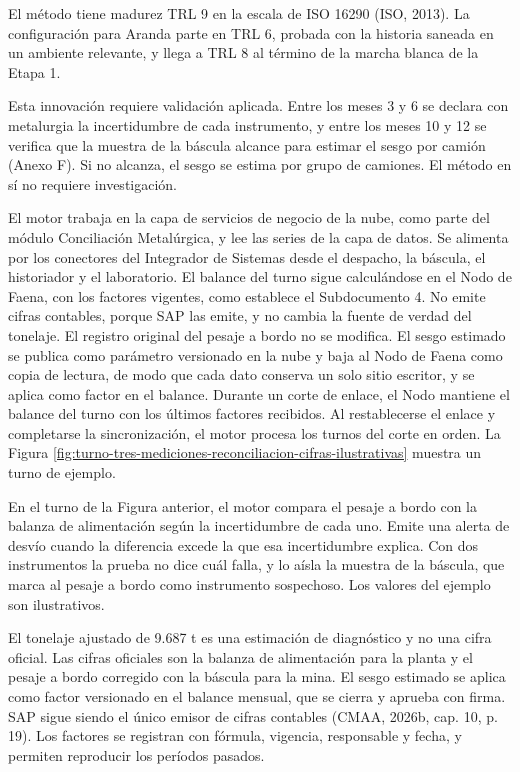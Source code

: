\documentclass[subdoc]{../../comun/overfore}
\begin{document}
El método tiene madurez TRL 9 en la escala de ISO 16290 (ISO, 2013). La configuración para Aranda parte en TRL 6, probada con la historia saneada en un ambiente relevante, y llega a TRL 8 al término de la marcha blanca de la Etapa 1.

Esta innovación requiere validación aplicada. Entre los meses 3 y 6 se declara con metalurgia la incertidumbre de cada instrumento, y entre los meses 10 y 12 se verifica que la muestra de la báscula alcance para estimar el sesgo por camión (Anexo F). Si no alcanza, el sesgo se estima por grupo de camiones. El método en sí no requiere investigación.

El motor trabaja en la capa de servicios de negocio de la nube, como parte del módulo Conciliación Metalúrgica, y lee las series de la capa de datos. Se alimenta por los conectores del Integrador de Sistemas desde el despacho, la báscula, el historiador y el laboratorio. El balance del turno sigue calculándose en el Nodo de Faena, con los factores vigentes, como establece el Subdocumento 4. No emite cifras contables, porque SAP las emite, y no cambia la fuente de verdad del tonelaje. El registro original del pesaje a bordo no se modifica. El sesgo estimado se publica como parámetro versionado en la nube y baja al Nodo de Faena como copia de lectura, de modo que cada dato conserva un solo sitio escritor, y se aplica como factor en el balance. Durante un corte de enlace, el Nodo mantiene el balance del turno con los últimos factores recibidos. Al restablecerse el enlace y completarse la sincronización, el motor procesa los turnos del corte en orden. La Figura \ref{fig:turno-tres-mediciones-reconciliacion-cifras-ilustrativas} muestra un turno de ejemplo.

En el turno de la Figura anterior, el motor compara el pesaje a bordo con la balanza de alimentación según la incertidumbre de cada uno. Emite una alerta de desvío cuando la diferencia excede la que esa incertidumbre explica. Con dos instrumentos la prueba no dice cuál falla, y lo aísla la muestra de la báscula, que marca al pesaje a bordo como instrumento sospechoso. Los valores del ejemplo son ilustrativos.

El tonelaje ajustado de 9.687 t es una estimación de diagnóstico y no una cifra oficial. Las cifras oficiales son la balanza de alimentación para la planta y el pesaje a bordo corregido con la báscula para la mina. El sesgo estimado se aplica como factor versionado en el balance mensual, que se cierra y aprueba con firma. SAP sigue siendo el único emisor de cifras contables (CMAA, 2026b, cap. 10, p. 19). Los factores se registran con fórmula, vigencia, responsable y fecha, y permiten reproducir los períodos pasados.
\end{document}
